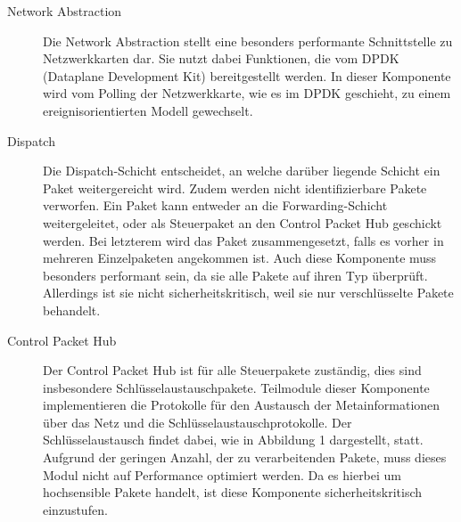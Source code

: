 \documentclass[a4paper, 11pt, ngerman, fleqn]{article}
\begin{document}
\begin{description}
	
	\item[Network Abstraction] 
	Die Network Abstraction stellt eine besonders performante Schnittstelle zu Netzwerkkarten dar. 
	Sie nutzt dabei Funktionen, die vom DPDK (Dataplane Development Kit) bereitgestellt werden.
	In dieser Komponente wird vom Polling der Netzwerkkarte, wie es im DPDK geschieht, zu einem ereignisorientierten Modell gewechselt.
	
	\item[Dispatch]
	Die Dispatch-Schicht entscheidet, an welche darüber liegende Schicht ein Paket weitergereicht wird. 
	Zudem werden nicht identifizierbare Pakete verworfen.
	Ein Paket kann entweder an die Forwarding-Schicht weitergeleitet, oder als Steuerpaket an den Control Packet Hub geschickt werden.
	Bei letzterem wird das Paket zusammengesetzt, falls es vorher in mehreren Einzelpaketen angekommen ist.
	Auch diese Komponente muss besonders performant sein, da sie alle Pakete auf ihren Typ überprüft. Allerdings ist sie nicht sicherheitskritisch, weil sie nur verschlüsselte Pakete behandelt.
	
	\item[Control Packet Hub]
	Der Control Packet Hub ist für alle Steuerpakete zuständig, dies sind insbesondere Schlüsselaustauschpakete.
	Teilmodule dieser Komponente implementieren die Protokolle für den Austausch der Metainformationen über das Netz und die Schlüsselaustauschprotokolle.
	Der Schlüsselaustausch findet dabei, wie in Abbildung 1 dargestellt, statt. 
	Aufgrund der geringen Anzahl, der zu verarbeitenden Pakete, muss dieses Modul nicht auf Performance optimiert werden. 
	Da es hierbei um hochsensible Pakete handelt, ist diese Komponente sicherheitskritisch einzustufen.
	

\end{description}
\end{document}
